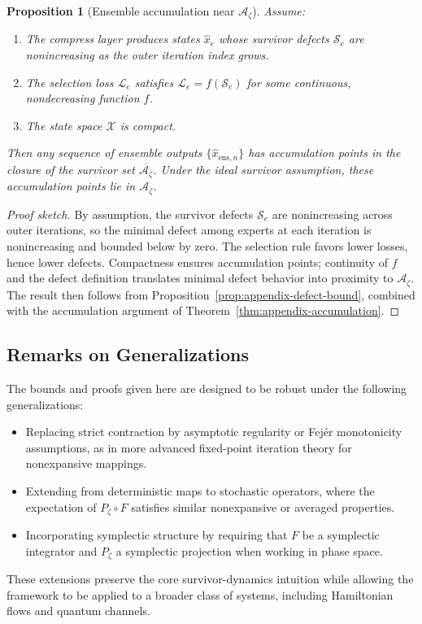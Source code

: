 \documentclass[11pt]{article}
\theoremstyle{definition}
\theoremstyle{plain}
\newtheorem{proposition}[definition]{Proposition}
\theoremstyle{remark}
\newcommand{\Azet}{\mathcal{A}_\zeta}
\newcommand{\Xc}{\mathcal{X}}
\begin{document}
\begin{proposition}[Ensemble accumulation near $\Azet$]
\label{prop:appendix-ensemble-accum}
Assume:
\begin{enumerate}
  \item The compress layer produces states $\hat{x}_e$ whose survivor defects $\mathcal{S}_e$ are nonincreasing as the outer iteration index grows.
  \item The selection loss $\mathcal{L}_e$ satisfies $\mathcal{L}_e = f(\mathcal{S}_e)$ for some continuous, nondecreasing function $f$.
  \item The state space $\Xc$ is compact.
\end{enumerate}
Then any sequence of ensemble outputs $\{\hat{x}_{\mathrm{ens},n}\}$ has accumulation points in the closure of the survivor set $\overline{\Azet}$. Under the ideal survivor assumption, these accumulation points lie in $\Azet$.
\end{proposition}

\begin{proof}[Proof sketch]
By assumption, the survivor defects $\mathcal{S}_e$ are nonincreasing across outer iterations, so the minimal defect among experts at each iteration is nonincreasing and bounded below by zero. The selection rule favors lower losses, hence lower defects. Compactness ensures accumulation points; continuity of $f$ and the defect definition translates minimal defect behavior into proximity to $\Azet$. The result then follows from Proposition~\ref{prop:appendix-defect-bound}, combined with the accumulation argument of Theorem~\ref{thm:appendix-accumulation}.
\end{proof}

\subsection{Remarks on Generalizations}

The bounds and proofs given here are designed to be robust under the following generalizations:
\begin{itemize}
  \item Replacing strict contraction by asymptotic regularity or Fejér monotonicity assumptions, as in more advanced fixed-point iteration theory for nonexpansive mappings.
  \item Extending from deterministic maps to stochastic operators, where the expectation of $P_\zeta\circ F$ satisfies similar nonexpansive or averaged properties.
  \item Incorporating symplectic structure by requiring that $F$ be a symplectic integrator and $P_\zeta$ a symplectic projection when working in phase space.
\end{itemize}
These extensions preserve the core survivor-dynamics intuition while allowing the framework to be applied to a broader class of systems, including Hamiltonian flows and quantum channels.
\end{document}

